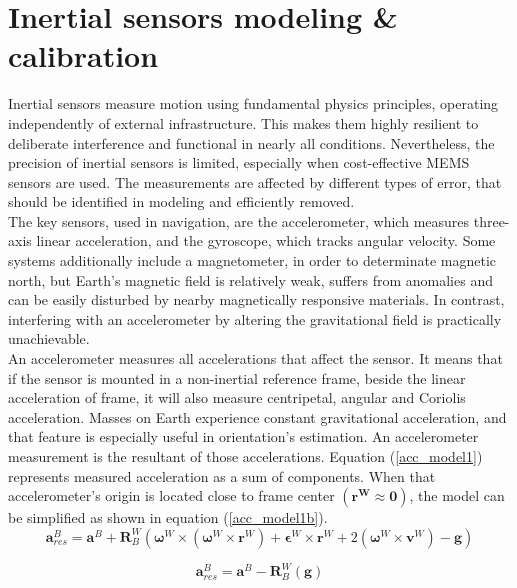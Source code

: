 \section{Inertial sensors modeling \& calibration}

Inertial sensors measure motion using fundamental physics principles, operating independently of external infrastructure. This makes them highly resilient to deliberate interference and functional in nearly all conditions. Nevertheless, the precision of inertial sensors is limited, especially when cost-effective MEMS sensors are used. The measurements are affected by different types of error, that should be identified in modeling and efficiently removed.\\

The key sensors, used in navigation, are the accelerometer, which measures three-axis linear acceleration, and the gyroscope, which tracks angular velocity. Some systems additionally include a magnetometer, in order to determinate magnetic north, but Earth’s magnetic field is relatively weak, suffers from anomalies and can be easily disturbed by nearby magnetically responsive materials. In contrast, interfering with an accelerometer by altering the gravitational field is practically unachievable.\\

An accelerometer measures all accelerations that affect the sensor. It means that if the sensor is mounted in a non-inertial reference frame, beside the linear acceleration of frame, it will also measure centripetal, angular and Coriolis acceleration. Masses on Earth experience constant gravitational acceleration, and that feature is especially useful in orientation's estimation. An accelerometer measurement is the resultant of those accelerations. Equation (\ref{acc_model1}) represents measured acceleration as a sum of components. When that accelerometer's origin is located close to frame center $\left( \bm{r^W} \approx \bm{0}\right)$, the model can be simplified as shown in equation (\ref{acc_model1b}).
\\
\begin{equation}
	\bm{a}_{res}^B = \bm{a}^B + \bm{R}^W_B \left( \bm{\omega}^W \times \left( \bm{\omega}^W \times \bm{r}^W \right) + \bm{\epsilon}^W \times \bm{r}^W + 2\left( \bm{\omega}^W \times \bm{v}^W \right) - \bm{g}  \right)  
	\label{acc_model1}
\end{equation}

\begin{equation}
	\bm{a}_{res}^B = \bm{a}^B - \bm{R}^W_B \left( \bm{g}  \right)  
	\label{acc_model1b}
\end{equation}

